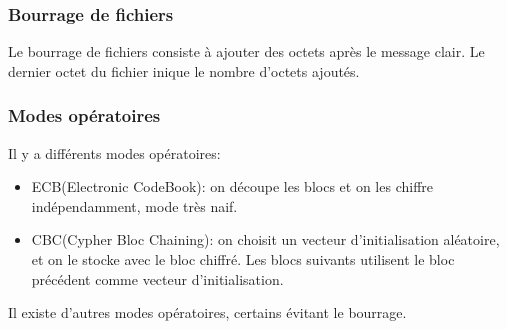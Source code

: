 \subsubsection{Bourrage de fichiers}
Le bourrage de fichiers consiste à ajouter des octets après le message clair. Le dernier octet du fichier inique le
nombre d'octets ajoutés.

\subsubsection{Modes opératoires}
Il y a différents modes opératoires:
\begin{itemize}
	\item ECB(Electronic CodeBook): on découpe les blocs et on les chiffre indépendamment, mode très naif.
	\item CBC(Cypher Bloc Chaining): on choisit un vecteur d'initialisation aléatoire, et on le stocke avec le bloc
	chiffré. Les blocs suivants utilisent le bloc précédent comme vecteur d'initialisation.
\end{itemize}
Il existe d'autres modes opératoires, certains évitant le bourrage.
